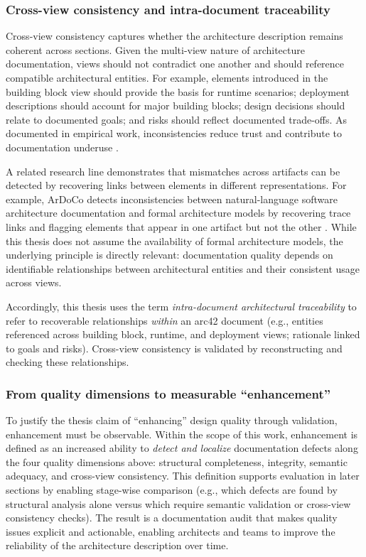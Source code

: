 \subsubsection{Cross-view consistency and intra-document traceability}
Cross-view consistency captures whether the architecture description remains coherent across sections. Given the multi-view nature of architecture documentation, views should not contradict one another and should reference compatible architectural entities. For example, elements introduced in the building block view should provide the basis for runtime scenarios; deployment descriptions should account for major building blocks; design decisions should relate to documented goals; and risks should reflect documented trade-offs. As documented in empirical work, inconsistencies reduce trust and contribute to documentation underuse \cite{wohlrab_icsa19_guidelines}.

A related research line demonstrates that mismatches across artifacts can be detected by recovering links between elements in different representations. For example, ArDoCo detects inconsistencies between natural-language software architecture documentation and formal architecture models by recovering trace links and flagging elements that appear in one artifact but not the other \cite{ardoco_icsa23_inconsistency_detection}. While this thesis does not assume the availability of formal architecture models, the underlying principle is directly relevant: documentation quality depends on identifiable relationships between architectural entities and their consistent usage across views.

Accordingly, this thesis uses the term \emph{intra-document architectural traceability} to refer to recoverable relationships \emph{within} an arc42 document (e.g., entities referenced across building block, runtime, and deployment views; rationale linked to goals and risks). Cross-view consistency is validated by reconstructing and checking these relationships.

\subsubsection{From quality dimensions to measurable ``enhancement''}
To justify the thesis claim of ``enhancing'' design quality through validation, enhancement must be observable. Within the scope of this work, enhancement is defined as an increased ability to \emph{detect and localize} documentation defects along the four quality dimensions above: structural completeness, integrity, semantic adequacy, and cross-view consistency. This definition supports evaluation in later sections by enabling stage-wise comparison (e.g., which defects are found by structural analysis alone versus which require semantic validation or cross-view consistency checks). The result is a documentation audit that makes quality issues explicit and actionable, enabling architects and teams to improve the reliability of the architecture description over time.
